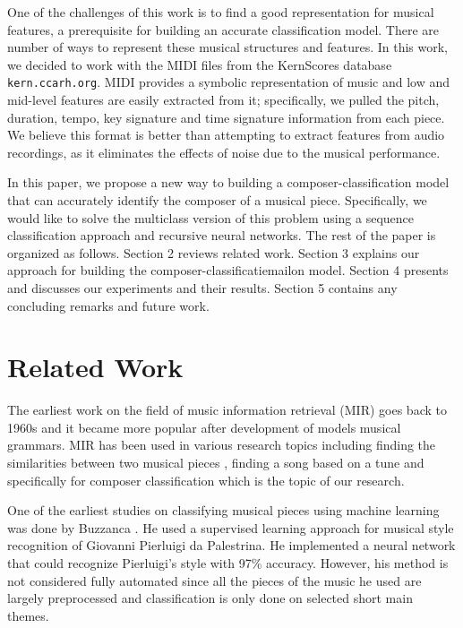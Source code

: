 \documentclass[11pt,a4paper]{article}
\begin{document}
One of the challenges of this work is to find a good representation for musical features, a prerequisite for building an accurate classification model. There are number of ways to represent these musical structures and features.  In this work, we decided to work with the MIDI files from the KernScores database \texttt{kern.ccarh.org}. MIDI provides a symbolic representation of music and low and mid-level features are easily extracted from it; specifically, we pulled the pitch, duration, tempo, key signature and time signature information from each piece. We believe this format is better than attempting to extract features from audio recordings, as it eliminates the effects of noise due to the musical performance.

In this paper, we propose a new way to building a composer-classification model that can accurately identify the composer of a musical piece. Specifically, we would like to solve the multiclass version of this problem using a sequence classification approach and recursive neural networks. The rest of the paper is organized as follows. Section 2 reviews related work. Section 3 explains our approach for building the composer-classificatiemailon model. Section 4 presents and discusses our experiments and their results. Section 5 contains any concluding remarks and future work.


\section{Related Work}

The earliest work on the field of music information retrieval (MIR) goes back to 1960s \cite {Kassler} and it became more popular after development of models musical grammars. MIR has been used in various research topics including finding the similarities between two musical pieces \cite{Berenzweig}, finding a song based on a tune \cite {Ghias} and specifically for composer classification which is the topic of our research.

One of the earliest studies on classifying musical pieces using machine learning was done by Buzzanca \cite{Buzz}. He used a supervised learning approach for musical style recognition of Giovanni Pierluigi da Palestrina. He implemented a neural network that could recognize Pierluigi's style with 97\% accuracy. However, his method is not considered fully automated since all the pieces of the music he used are largely preprocessed and classification is only done on selected short main themes.
\end{document}
